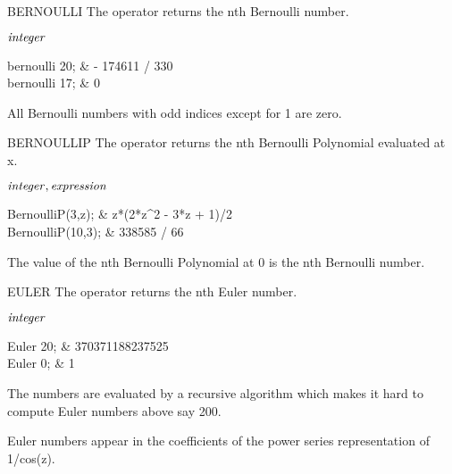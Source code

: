 \begin{Operator}{BERNOULLI}
The  operator returns the nth Bernoulli number.

\begin{Syntax}

\(\meta{integer}\)

\end{Syntax}

\begin{Examples}
bernoulli 20;                  &       - 174611 / 330 \\
bernoulli 17;                  &       0
\end{Examples}

\begin{Comments}
All Bernoulli numbers with odd indices except for 1 are zero.
\end{Comments}
\end{Operator}

\begin{Operator}{BERNOULLIP}
The  operator returns the nth Bernoulli Polynomial
evaluated at x.

\begin{Syntax}

\(\meta{integer},\meta{expression}\)

\end{Syntax}

\begin{Examples}
BernoulliP(3,z);            &    z*(2*z^2  - 3*z + 1)/2\\

BernoulliP(10,3);           &    338585 / 66
\end{Examples}

\begin{Comments}
The value of the nth Bernoulli Polynomial at 0 is the nth Bernoulli number. 
\end{Comments}
\end{Operator}

\begin{Operator}{EULER}
The  operator returns the nth Euler number.

\begin{Syntax}
\(\meta{integer}\)
\end{Syntax}

\begin{Examples}
Euler 20;                         &       370371188237525 \\
Euler 0;                          &       1
\end{Examples}

\begin{Comments}
The  numbers are evaluated by a recursive algorithm which
makes it hard to compute Euler numbers above say 200.

Euler numbers appear in the coefficients of the power series 
representation of 1/cos(z).
\end{Comments}
\end{Operator}


